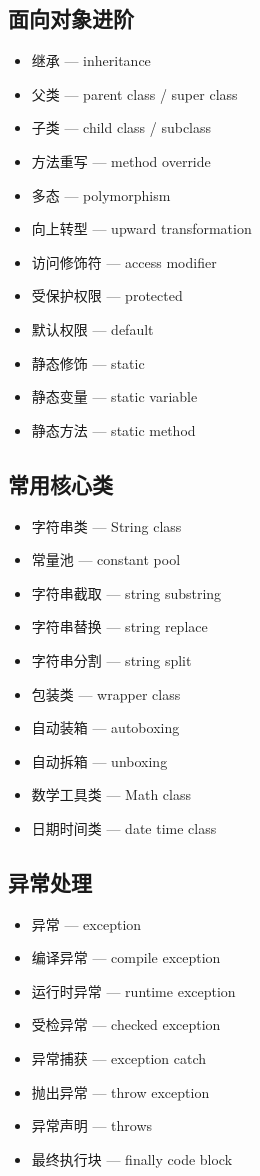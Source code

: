 \subsection{面向对象进阶}
\begin{itemize}
\item 继承 — inheritance
\item 父类 — parent class / super class
\item 子类 — child class / subclass
\item 方法重写 — method override
\item 多态 — polymorphism
\item 向上转型 — upward transformation
\item 访问修饰符 — access modifier
\item 受保护权限 — protected
\item 默认权限 — default
\item 静态修饰 — static
\item 静态变量 — static variable
\item 静态方法 — static method
\end{itemize}

\subsection{常用核心类}
\begin{itemize}
\item 字符串类 — String class
\item 常量池 — constant pool
\item 字符串截取 — string substring
\item 字符串替换 — string replace
\item 字符串分割 — string split
\item 包装类 — wrapper class
\item 自动装箱 — autoboxing
\item 自动拆箱 — unboxing
\item 数学工具类 — Math class
\item 日期时间类 — date time class
\end{itemize}

\subsection{异常处理}
\begin{itemize}
\item 异常 — exception
\item 编译异常 — compile exception
\item 运行时异常 — runtime exception
\item 受检异常 — checked exception
\item 异常捕获 — exception catch
\item 抛出异常 — throw exception
\item 异常声明 — throws
\item 最终执行块 — finally code block
\end{itemize}

